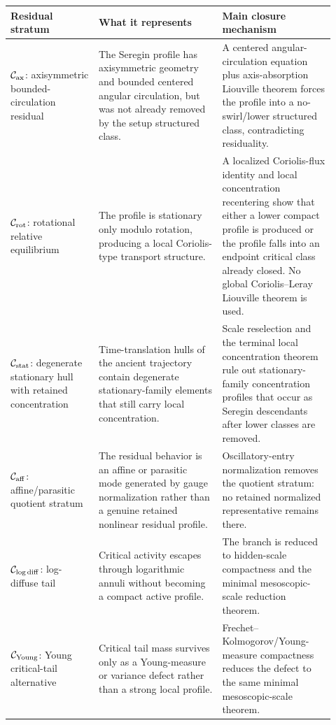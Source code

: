 \documentclass[11pt]{amsart}
\begin{document}
\begin{longtable}{@{}>{\raggedright\arraybackslash}p{0.25\linewidth}>{\raggedright\arraybackslash}p{0.35\linewidth}>{\raggedright\arraybackslash}p{0.32\linewidth}@{}}
\toprule
\textbf{Residual stratum} & \textbf{What it represents} & \textbf{Main closure mechanism} \\
\midrule
\endhead
\(\mathcal C_{\rm ax}\): axisymmetric bounded-circulation residual & The Seregin profile has axisymmetric geometry and bounded centered angular circulation, but was not already removed by the setup structured class. & A centered angular-circulation equation plus axis-absorption Liouville theorem forces the profile into a no-swirl/lower structured class, contradicting residuality. \\
\(\mathcal C_{\rm rot}\): rotational relative equilibrium & The profile is stationary only modulo rotation, producing a local Coriolis-type transport structure. & A localized Coriolis-flux identity and local concentration recentering show that either a lower compact profile is produced or the profile falls into an endpoint critical class already closed. No global Coriolis--Leray Liouville theorem is used. \\
\(\mathcal C_{\rm stat}\): degenerate stationary hull with retained concentration & Time-translation hulls of the ancient trajectory contain degenerate stationary-family elements that still carry local concentration. & Scale reselection and the terminal local concentration theorem rule out stationary-family concentration profiles that occur as Seregin descendants after lower classes are removed. \\
\(\mathcal C_{\rm aff}\): affine/parasitic quotient stratum & The residual behavior is an affine or parasitic mode generated by gauge normalization rather than a genuine retained nonlinear residual profile. & Oscillatory-entry normalization removes the quotient stratum: no retained normalized representative remains there. \\
\(\mathcal C_{\log\rm diff}\): log-diffuse tail & Critical activity escapes through logarithmic annuli without becoming a compact active profile. & The branch is reduced to hidden-scale compactness and the minimal mesoscopic-scale reduction theorem. \\
\(\mathcal C_{\rm Young}\): Young critical-tail alternative & Critical tail mass survives only as a Young-measure or variance defect rather than a strong local profile. & Frechet--Kolmogorov/Young-measure compactness reduces the defect to the same minimal mesoscopic-scale theorem. \\

\end{longtable}
\end{document}
